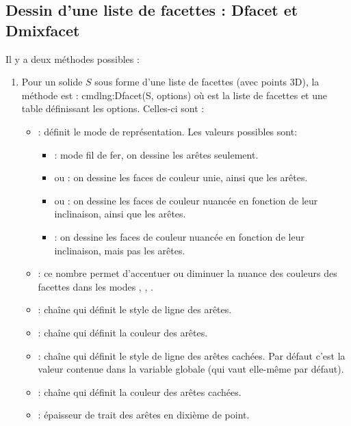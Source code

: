\subsection{Dessin d'une liste de facettes : Dfacet et Dmixfacet}

Il y a deux méthodes possibles :
\begin{enumerate}
    \item Pour un solide $S$ sous forme d'une liste de facettes (avec points 3D), la méthode est :
    cmdln{g:Dfacet(S, options)}
    où  est la liste de facettes et  une table définissant les options. Celles-ci sont :
    \begin{itemize}
        \item {} : définit le mode de représentation. Les valeurs possibles sont:
            \begin{itemize}
                \item {} : mode fil de fer, on dessine les arêtes seulement.
                \item {} ou  : on dessine les faces de couleur unie, ainsi que les arêtes.
                \item {} ou  : on dessine les faces de couleur nuancée en fonction de leur inclinaison, ainsi que les arêtes.
                \item {} : on dessine les faces de couleur nuancée en fonction de leur inclinaison, mais pas les arêtes.
            \end{itemize}
        \item {} : ce nombre permet d'accentuer ou diminuer la nuance des couleurs des facettes dans les modes , , .
        \item {} : chaîne qui définit le style de ligne des arêtes.
        \item {} : chaîne qui définit la couleur des arêtes.
        \item {} : chaîne qui définit le style de ligne des arêtes cachées. Par défaut c'est la valeur contenue dans la variable globale  (qui vaut elle-même  par défaut).
        \item {} : chaîne qui définit la couleur des arêtes cachées.
        \item {} : épaisseur de trait des arêtes en dixième de point.

\end{itemize}
\end{enumerate}
